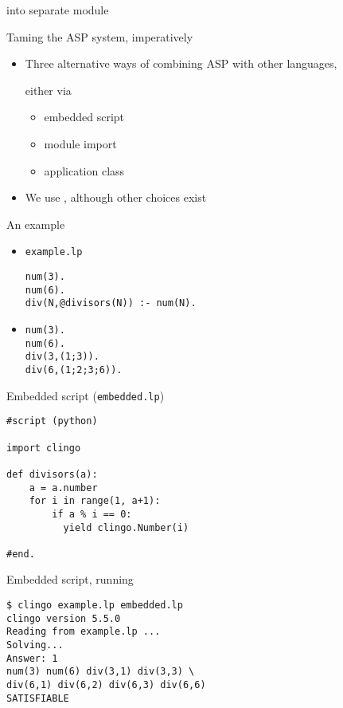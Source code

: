\REFACTORED into separate module
\begin{frame}{Taming the ASP system, imperatively}
  \bigskip
  \begin{itemize}
  \item Three alternative ways of combining ASP with other languages,

    either via
    \begin{itemize}\normalsize
    \item embedded script
    \item module import
    \item application class
    \end{itemize}
    \bigskip
  \item We use \python, although other choices exist
  \end{itemize}
\end{frame}
\begin{frame}[fragile]{An example}
  \bigskip
  \begin{itemize}
  \item<1->   \texttt{example.lp}
\begin{lstlisting}
num(3).
num(6).
div(N,@divisors(N)) :- num(N).
\end{lstlisting}
  \bigskip
  \item<2-> 
\begin{lstlisting}
num(3).
num(6).
div(3,(1;3)).
div(6,(1;2;3;6)).
\end{lstlisting}
  \end{itemize}
\end{frame}
\begin{frame}[fragile]{Embedded script (\texttt{embedded.lp})}
  \bigskip
\begin{lstlisting}
#script (python)

import clingo

def divisors(a):
    a = a.number
    for i in range(1, a+1):
        if a % i == 0:
          yield clingo.Number(i)

#end.
\end{lstlisting}
\end{frame}
\begin{frame}[fragile]{Embedded script, running}
  \bigskip
\begin{lstlisting}
$ clingo example.lp embedded.lp
clingo version 5.5.0
Reading from example.lp ...
Solving...
Answer: 1
num(3) num(6) div(3,1) div(3,3) \
div(6,1) div(6,2) div(6,3) div(6,6)
SATISFIABLE
\end{lstlisting}
\end{frame}
